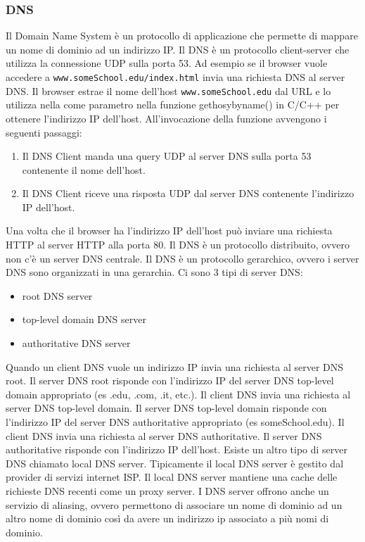 \documentclass[12pt]{article}
\begin{document}
\subsubsection{DNS}
Il Domain Name System è un protocollo di applicazione che permette di mappare un nome di dominio ad un indirizzo IP.
Il DNS è un protocollo client-server che utilizza la connessione UDP sulla porta 53.
Ad esempio se il browser vuole accedere a \texttt{www.someSchool.edu/index.html} invia una richiesta DNS al server DNS.
Il browser estrae il nome dell'host \texttt{www.someSchool.edu} dal URL e lo utilizza  nella come parametro nella funzione gethosybyname() in C/C++ per ottenere l'indirizzo IP dell'host. All'invocazione della funzione avvengono i seguenti passaggi:
\begin{enumerate}
    \item Il DNS Client manda una query UDP al server DNS sulla porta 53 contenente il nome dell'host.
    \item Il DNS Client riceve una risposta UDP dal server DNS contenente l'indirizzo IP dell'host.
\end{enumerate}
Una volta che il browser ha l'indirizzo IP dell'host può inviare una richiesta HTTP al server HTTP alla porta 80.
Il DNS è un protocollo distribuito, ovvero non c'è un server DNS centrale.
Il DNS è un protocollo gerarchico, ovvero i server DNS sono organizzati in una gerarchia.
Ci sono 3 tipi di server DNS:
\begin{itemize}
    \item root DNS server
    \item top-level domain DNS server
    \item authoritative DNS server
\end{itemize}
Quando un client DNS vuole un indirizzo IP invia una richiesta al server DNS root.
Il server DNS root risponde con l'indirizzo IP del server DNS top-level domain appropriato (es .edu, .com, .it, etc.).
Il client DNS invia una richiesta al server DNS top-level domain.
Il server DNS top-level domain risponde con l'indirizzo IP del server DNS authoritative appropriato (es someSchool.edu).
Il client DNS invia una richiesta al server DNS authoritative.
Il server DNS authoritative risponde con l'indirizzo IP dell'host.
Esiste un altro tipo di server DNS chiamato local DNS server.
Tipicamente il local DNS server è gestito dal provider di servizi internet ISP.
Il local DNS server mantiene una cache delle richieste DNS recenti come un proxy server.
I DNS server offrono anche un servizio di aliasing, ovvero permettono di associare un nome di dominio ad un altro nome di dominio così da avere un indirizzo ip associato a più nomi di dominio.
\end{document}
